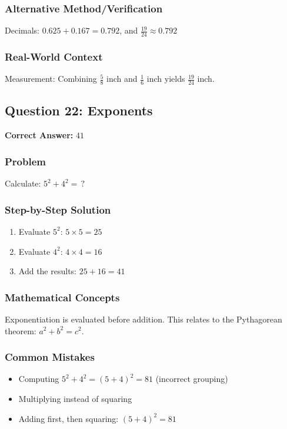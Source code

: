 \documentclass[12pt,a4paper]{article}
\begin{document}
\subsubsection*{Alternative Method/Verification}
Decimals: $0.625 + 0.167 = 0.792$, and $\frac{19}{24} \approx 0.792$ 

\subsubsection*{Real-World Context}
Measurement: Combining $\frac{5}{8}$ inch and $\frac{1}{6}$ inch yields $\frac{19}{24}$ inch.

\vspace{0.5cm}

\subsection*{Question 22: Exponents}

\textbf{Correct Answer:} $41$

\subsubsection*{Problem}
Calculate: $5^2 + 4^2 = \,?$

\subsubsection*{Step-by-Step Solution}
\begin{enumerate}
    \item Evaluate $5^2$: $5 \times 5 = 25$
    \item Evaluate $4^2$: $4 \times 4 = 16$
    \item Add the results: $25 + 16 = 41$
\end{enumerate}

\subsubsection*{Mathematical Concepts}
Exponentiation is evaluated before addition. This relates to the Pythagorean theorem: $a^2 + b^2 = c^2$.

\subsubsection*{Common Mistakes}
\begin{itemize}
    \item Computing $5^2 + 4^2 = (5 + 4)^2 = 81$ (incorrect grouping)
    \item Multiplying instead of squaring
    \item Adding first, then squaring: $(5 + 4)^2 = 81$
\end{itemize}
\end{document}

